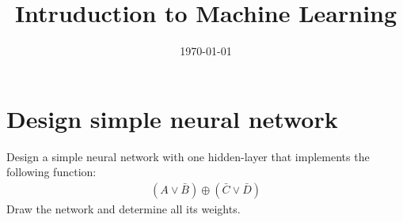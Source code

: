 \documentclass[12pt]{article}
\title{Intruduction to Machine Learning}
\date{\today}
\begin{document}
\maketitlepage
\maketitlestart

\section{Design simple neural network}
Design a simple neural network with one hidden-layer that implements the following function:
\begin{gather*}
    (A\vee \bar{B}) \oplus (\bar{C} \vee \bar{D})
\end{gather*}
Draw the network and determine all its weights.
\begin{qsolve}
    \begin{gather*}

    \end{gather*}
\end{qsolve}




















\makeendpage
\end{document}
